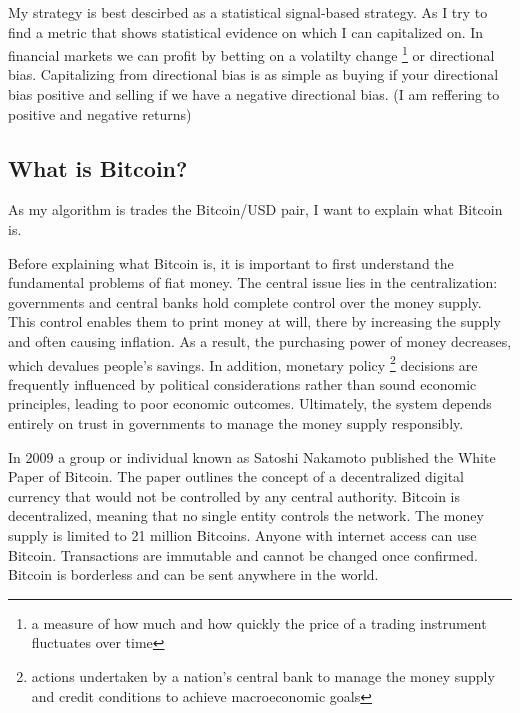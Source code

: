 \documentclass[12pt]{article}
\begin{document}
My strategy is best descirbed as a statistical signal-based strategy. As I try to find a metric that shows statistical evidence on which I can capitalized on. In financial markets we can profit by betting on a volatilty change \footnote{a measure of how much and how quickly the price of a trading instrument fluctuates over time} or directional bias. Capitalizing from directional bias is as simple as buying if your directional bias positive and selling if we have a negative directional bias. (I am reffering to positive and negative returns)



















\newpage
\subsection{What is Bitcoin?}

As my algorithm is trades the Bitcoin/USD pair, I want to explain what Bitcoin is.

Before explaining what Bitcoin is, it is important to first understand the fundamental problems of fiat money. 
The central issue lies in the centralization: governments and central banks hold complete control over the money supply. This control enables them to print money at will, there by increasing the supply and often causing inflation. As a result, the purchasing power of money decreases, which devalues people’s savings. In addition, monetary policy \footnote[1]{actions undertaken by a nation's central bank to manage the money supply and credit conditions to achieve macroeconomic goals} 
decisions are frequently influenced by political considerations rather than sound economic principles, leading to poor economic outcomes. Ultimately, the system depends entirely on trust in governments to manage the money supply responsibly.


In 2009 a group or individual known as Satoshi Nakamoto published the White Paper of Bitcoin. The paper outlines the concept of a decentralized digital currency that would not be controlled by any central authority. Bitcoin is decentralized, meaning that no single entity controls the network. The money supply is limited to 21 million Bitcoins. Anyone with internet access can use Bitcoin. Transactions are immutable and cannot be changed once confirmed. Bitcoin is borderless and can be sent anywhere in the world.
\end{document}
